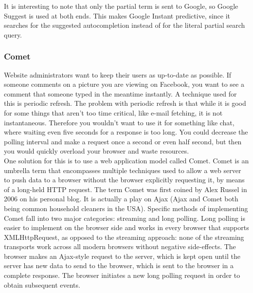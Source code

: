 It is interesting to note that only the partial term is sent to Google, so Google Suggest is used at both ends. This makes Google Instant predictive, since it searches for the suggested autocompletion instead of for the literal partial search query.
	
\subsubsection{Comet}
Website administrators want to keep their users as up-to-date as possible. If someone comments on a picture you are viewing on Facebook, you want to see a comment that someone typed in the meantime instantly. A technique used for this is periodic refresh. The problem with periodic refresh is that while it is good for some things that aren't too time critical, like e-mail fetching, it is not instantaneous. Therefore you wouldn't want to use it for something like chat, where waiting even five seconds for a response is too long. You could decrease the polling interval and make a request once a second or even half second, but then you would quickly overload your browser and waste resources.\\
	
One solution for this is to use a web application model called Comet. Comet is an umbrella term that encompasses multiple techniques used to allow a web server to push data to a browser without the browser explicitly requesting it, by means of a long-held HTTP request. The term Comet was first coined by Alex Russel in 2006 on his personal blog\cite{noted3comet}. It is actually a play on Ajax (Ajax and Comet both being common household cleaners in the USA). Specific methods of implementing Comet fall into two major categories: streaming and long polling. Long polling is easier to implement on the browser side and works in every browser that supports XMLHttpRequest, as opposed to the streaming approach: none of the streaming transports work across all modern browsers without negative side-effects. The browser makes an Ajax-style request to the server, which is kept open until the server has new data to send to the browser, which is sent to the browser in a complete response. The browser initiates a new long polling request in order to obtain subsequent events.